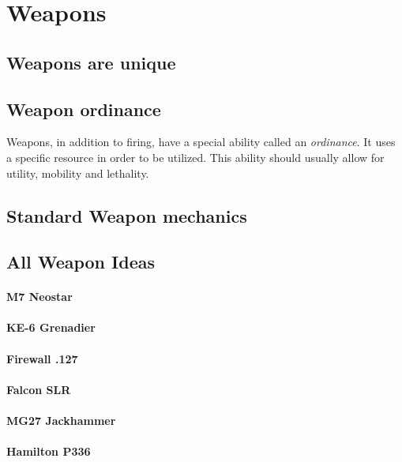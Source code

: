 \documentclass[../Main.tex]{subfiles}
\begin{document}
\section{Weapons}


\subsection{Weapons are unique}


\subsection{Weapon ordinance}

Weapons, in addition to firing, have a special ability called an \emph{ordinance}. It uses a specific resource in order to be utilized. This ability should usually allow for utility, mobility and lethality.

\subsection{Standard Weapon mechanics}


\subsection{All Weapon Ideas}


\paragraph{M7 Neostar}


\paragraph{KE-6 Grenadier}
 

\paragraph{Firewall .127}


\paragraph{Falcon SLR}


\paragraph{MG27 Jackhammer}


\paragraph{Hamilton P336}
\end{document}

